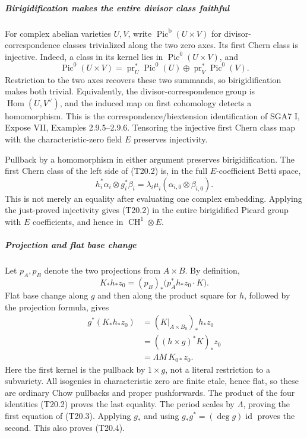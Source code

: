 \subparagraph{Birigidification makes the entire divisor class faithful}\label{birigidification-makes-the-entire-divisor-class-faithful}

For complex abelian varieties \(U,V\), write \(\operatorname{Pic}^{\mathrm b}(U\times V)\) for divisor-correspondence classes trivialized along the two zero axes. Its first Chern class is injective. Indeed, a class in its kernel lies in \(\operatorname{Pic}^0(U\times V)\), and \[
 \operatorname{Pic}^0(U\times V)
 =\operatorname{pr}_U^*\operatorname{Pic}^0(U)
  \oplus\operatorname{pr}_V^*\operatorname{Pic}^0(V).
\] Restriction to the two axes recovers these two summands, so birigidification makes both trivial. Equivalently, the divisor-correspondence group is \(\operatorname{Hom}(U,V^\vee)\), and the induced map on first cohomology detects a homomorphism. This is the correspondence/biextension identification of SGA7 I, Expose VII, Examples 2.9.5--2.9.6. Tensoring the injective first Chern class map with the characteristic-zero field \(E\) preserves injectivity.

Pullback by a homomorphism in either argument preserves birigidification. The first Chern class of the left side of (T20.2) is, in the full \(E\)-coefficient Betti space, \[
 h_i^*\alpha_i\otimes g_i^*\beta_i
   =\lambda_i\mu_i(\alpha_{i,0}\otimes\beta_{i,0}).
\] This is not merely an equality after evaluating one complex embedding. Applying the just-proved injectivity gives (T20.2) in the entire birigidified Picard group with \(E\) coefficients, and hence in \(\operatorname{CH}^1\otimes E\).

\subparagraph{Projection and flat base change}\label{projection-and-flat-base-change}

Let \(p_A,p_B\) denote the two projections from \(A\times B\). By definition, \[
 K_*h_*z_0=(p_B)_*\bigl(p_A^*h_*z_0\cdot K\bigr).
\] Flat base change along \(g\) and then along the product square for \(h\), followed by the projection formula, gives \[
 \begin{aligned}
 g^*(K_*h_*z_0)
 &= (K|_{A\times B_0})_*h_*z_0\\
 &= ((h\times g)^*K)_*z_0\\
 &=\Lambda M\,K_{0*}z_0.
 \end{aligned}
 \tag{T20.12}
\] Here the first kernel is the pullback by \(1\times g\), not a literal restriction to a subvariety. All isogenies in characteristic zero are finite etale, hence flat, so these are ordinary Chow pullbacks and proper pushforwards. The product of the four identities (T20.2) proves the last equality. The period scales by \(\Lambda\), proving the first equation of (T20.3). Applying \(g_*\) and using \(g_*g^*=(\deg g)\operatorname{id}\) proves the second. This also proves (T20.4).

